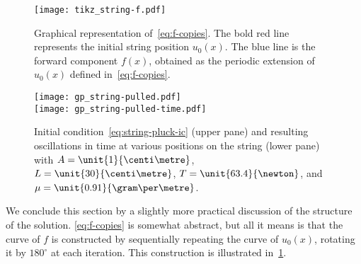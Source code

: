 \begin{figure}[t]
  \centering
  \texttt{[image: tikz\_string-f.pdf]}
  \caption{Graphical representation of~\cref{eq:f-copies}. The bold red line represents
    the initial string position $u_0(x)$. The blue line is the forward component $f(x)$,
  obtained as the periodic extension of $u_0(x)$ defined in~\cref{eq:f-copies}.}
  \label{fig:string-f}
\end{figure}
\begin{figure}[t]
  \centering
  \texttt{[image: gp\_string-pulled.pdf]}\\
  \texttt{[image: gp\_string-pulled-time.pdf]}
  \caption{Initial condition~\cref{eq:string-pluck-ic} (upper pane) and resulting
    oscillations in time at various positions on the string (lower pane) with
    $A=\unit{1}{\centi\metre}$, $L=\unit{30}{\centi\metre}$, $T=\unit{63.4}{\newton}$, and
  $\mu=\unit{0.91}{\gram\per\metre}$.}
  \label{fig:string-pulled}
\end{figure}
We conclude this section by a slightly more practical discussion of the structure of the
solution. \cref{eq:f-copies} is somewhat abstract, but all it means is that the curve of
$f$ is constructed by sequentially repeating the curve of $u_0(x)$, rotating it by
$180^{\circ}$ at each iteration. This construction is illustrated in~\cref{fig:string-f}.
%

